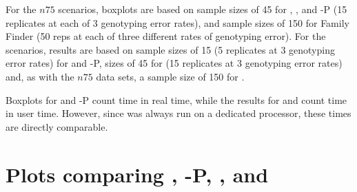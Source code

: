 \documentclass[11pt,landscape]{report}
\begin{document}
For the $n75$ scenarios, boxplots are based on sample sizes of 45 for \prt{}, \colony{}, and \colony{}-P (15 replicates at each of 3 genotyping error rates),  and sample sizes of 150 for Family Finder (50 reps at each of three different rates of genotyping error).  For the \lottalarge{} scenarios, results are based on sample sizes of 15 (5 replicates at 3 genotyping error rates) for \colony{} and \colony-P{}, sizes of 45 for \prt{} (15 replicates at 3 genotyping error rates) and, as with the $n75$ data sets, a sample size of 150 for \familyfinder{}. 

 
Boxplots for \colony{} and \colony{}-P count time in real time, while the results for \prt and \familyfinder count time in user time.  However, since \colony was always run on a dedicated processor, these times are directly comparable.
\newpage

\tableofcontents

\listoffigures

\part{Plots comparing \colony{}, \colony{}-P, \familyfinder{}, and \prt}


\end{document}
